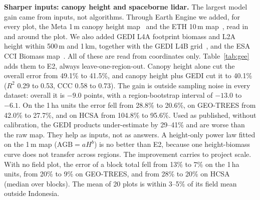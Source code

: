 \documentclass[conference,a4paper]{IEEEtran}
\begin{document}
\textbf{Sharper inputs: canopy height and spaceborne lidar.} The largest model gain came from inputs, not algorithms. Through Earth Engine we added, for every plot, the Meta 1\,m canopy height map~\cite{tolan2024meta} and the ETH 10\,m map~\cite{lang2023eth}, read in and around the plot. We also added GEDI L4A footprint biomass and L2A height within 500\,m and 1\,km, together with the GEDI L4B grid~\cite{duncanson2022gedi,dubayah2022gedi}, and the ESA CCI Biomass map~\cite{santoro2021global}. All of these are read from coordinates only. Table~\ref{tab:gee} adds them to E2, always leave-one-region-out. Canopy height alone cut the overall error from 49.1\% to 41.5\%, and canopy height plus GEDI cut it to 40.1\% ($R^2$ 0.29 to 0.53, CCC 0.58 to 0.73). The gain is outside sampling noise in every dataset: overall it is $-9.0$ points, with a region-bootstrap interval of $-13.0$ to $-6.1$. On the 1\,ha units the error fell from 28.8\% to 20.6\%, on GEO-TREES from 42.0\% to 27.7\%, and on HCSA from 104.8\% to 95.6\%. Used as published, without calibration, the GEDI products under-estimate by 29--41\% and are worse than the raw map. They help as inputs, not as answers. A height-only power law fitted on the 1\,m map ($\mathrm{AGB}=aH^b$) is no better than E2, because one height-biomass curve does not transfer across regions. The improvement carries to project scale. With no field plot, the error of a block total fell from 13\% to 7\% on the 1\,ha units, from 20\% to 9\% on GEO-TREES, and from 28\% to 20\% on HCSA (median over blocks). The mean of 20 plots is within 3--5\% of its field mean outside Indonesia.
\end{document}
